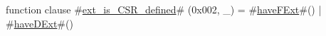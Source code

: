 function clause #\hyperref[sailRISCVzextzyiszyCSRzydefined]{ext\_is\_CSR\_defined}# (0x002, _) = #\hyperref[sailRISCVzhaveFExt]{haveFExt}#() | #\hyperref[sailRISCVzhaveDExt]{haveDExt}#()
